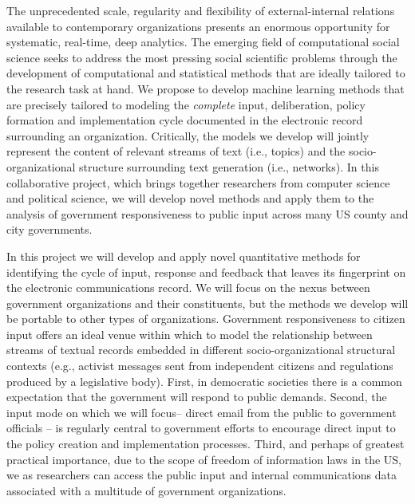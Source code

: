 The unprecedented scale, regularity and flexibility of external-internal relations available to contemporary organizations presents an enormous opportunity for systematic, real-time, deep analytics. The emerging field of computational social science seeks to address the most pressing social scientific problems through the development of computational and statistical methods that are ideally tailored to the research task at hand. We propose to develop machine learning methods that are precisely tailored to modeling the {\em complete} input, deliberation, policy formation and implementation cycle documented in the electronic record surrounding an organization. Critically, the models we develop will jointly represent the content of relevant streams of text (i.e., topics) and the socio-organizational structure surrounding text generation (i.e., networks). In this collaborative project, which brings together researchers from computer science and political science, we will develop novel methods and apply them to the analysis of government responsiveness to public input across many US county and city governments.


In this project we will develop and apply novel quantitative methods for identifying the cycle of input, response and feedback that leaves its fingerprint on the electronic communications record. We will focus on the nexus between government organizations and their constituents, but the methods we develop will be portable to other types of organizations. Government responsiveness to citizen input offers an ideal venue within which to model the relationship between streams of textual records embedded in different socio-organizational structural contexts (e.g., activist messages sent from independent citizens and regulations produced by a legislative body).  First, in democratic societies there is a common expectation that the government will respond to public demands. Second, the input mode on which we will focus-- direct email from the public to government officials -- is regularly central to government efforts to encourage direct input to the policy creation and implementation processes. Third, and perhaps of greatest practical importance, due to the scope of freedom of information laws in the US, we as researchers can access the public input and internal communications data associated with a multitude of government organizations.




